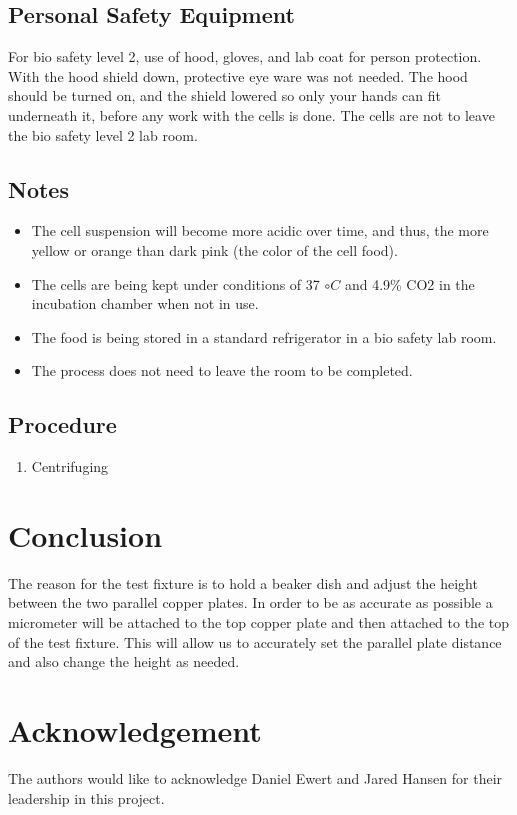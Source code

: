 \documentclass[journal]{IEEEtran}
\begin{document}
\subsection{Personal Safety Equipment}
For bio safety level 2, use of hood, gloves, and lab coat for person protection. With the hood shield down, protective eye ware was not needed. The hood should be turned on, and the shield lowered so only your hands can fit underneath it,  before any work with the cells is done. The cells are not to leave the bio safety level 2 lab room.

\subsection{Notes}
\begin{itemize}
\item The cell suspension will become more acidic over time, and thus, the more yellow or orange than dark pink (the color of the cell food).
\item The cells are being kept under conditions of 37 $\circ C$ and 4.9\% CO2 in the incubation chamber when not in use. 
\item The food is being stored in a standard refrigerator in a bio safety lab room.
\item The process does not need to leave the room to be completed.
\end{itemize}

\subsection{Procedure}
\begin{enumerate}
\item Centrifuging
\end{enumerate}

\section{Conclusion}
The reason for the test fixture is to hold a beaker dish and  adjust the height between the two parallel copper plates. In order to be as accurate as possible a micrometer will be attached to the top copper plate and then attached to the top of the test fixture. This will allow us to accurately set the parallel plate distance and also change the height as needed. 

\section{Acknowledgement}
The authors would like to acknowledge Daniel Ewert and Jared Hansen for their leadership in this project.
\end{document}
